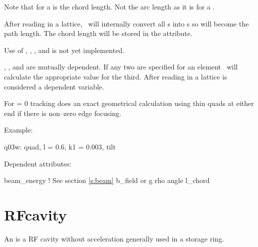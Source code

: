 Note that  for a  is the chord length. Not the arc length as
it is for a .

After reading in a lattice, \bmad\ will internally convert all s
into s so  will become the path length. The chord length will
be stored in the  attribute.

Use of , , , and  is not yet implemented.

, , and  are mutually dependent. If any two are specified
for an element \bmad\ will calculate the appropriate value for the third.
After reading in a lattice  is considered a dependent variable.

For  = 0  tracking does an exact geometrical 
calculation using thin quads at either end if there is non--zero edge
focusing.

\vskip0.05in \noindent
Example:
\begin{example}
  q03w: quad, l = 0.6, k1 = 0.003, tilt
\end{example}

\vskip0.05in \noindent
Dependent attributes:
\begin{example}
  beam\_energy  ! See section \ref{s:beam}
  b\_field or g
  rho
  angle
  l\_chord
\end{example}

\section{RFcavity}
\label{s:rfcav}

An  is a RF cavity without acceleration generally used in a storage ring.

